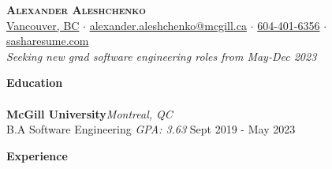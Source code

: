 \documentclass[a4paper]{article}
\newcommand{\lineunder} {
    \vspace*{-8pt} \\
    \hspace*{-18pt} \hrulefill \\
}
\newcommand{\header} [1] {
    {\hspace*{-18pt}\vspace*{6pt} \textbf{#1}}
    \vspace*{-6pt} \lineunder
}
\begin{document}
    

\vspace*{-10pt}
\begin{center}
	{\Huge \scshape \textbf{Alexander Aleshchenko}}\\
	\href{https://sasharesume.com/location}{Vancouver, BC} $\cdot$ \href{mailto:alexander.aleshchenko@mcgill.ca?subject=%5BContact%20from%20Resume%200xf44%5D&body=Hello%2C%20Alexander!%0D%0A%0D%0A...}{alexander.aleshchenko@mcgill.ca} $\cdot$ \href{tel:1-604-401-6356}{604-401-6356} $\cdot$ \href{https://sasharesume.com}{sasharesume.com}\\
	\textit{Seeking new grad software engineering roles from May-Dec 2023}
\end{center}

\header{Education}
\textbf{McGill University}\hfill \textit{Montreal, QC}\\
B.A Software Engineering \textit{GPA: 3.63} \hfill Sept 2019 - May 2023\\
\vspace{2mm}

\header{Experience}
\vspace{1mm}
\end{document}
